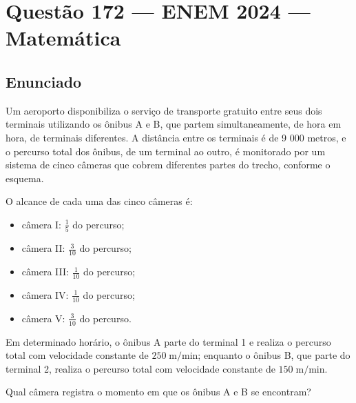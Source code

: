 \documentclass{article}
\begin{document}
\section*{Questão 172 --- ENEM 2024 --- Matemática}

\subsection*{Enunciado}
Um aeroporto disponibiliza o serviço de transporte gratuito entre seus dois terminais utilizando os ônibus A e B, que partem simultaneamente, de hora em hora, de terminais diferentes. A distância entre os terminais é de 9 000 metros, e o percurso total dos ônibus, de um terminal ao outro, é monitorado por um sistema de cinco câmeras que cobrem diferentes partes do trecho, conforme o esquema.

O alcance de cada uma das cinco câmeras é:
\begin{itemize}
  \item câmera I: $\frac{1}{5}$ do percurso;
  \item câmera II: $\frac{3}{10}$ do percurso;
  \item câmera III: $\frac{1}{10}$ do percurso;
  \item câmera IV: $\frac{1}{10}$ do percurso;
  \item câmera V: $\frac{3}{10}$ do percurso.
\end{itemize}

Em determinado horário, o ônibus A parte do terminal 1 e realiza o percurso total com velocidade constante de $250\; \mathrm{m/min}$; enquanto o ônibus B, que parte do terminal 2, realiza o percurso total com velocidade constante de $150 \; \mathrm{m/min}$.

Qual câmera registra o momento em que os ônibus A e B se encontram?
\end{document}
